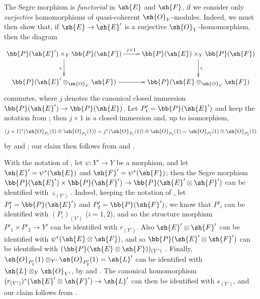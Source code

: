 \begin{env}[4.3.4]
\label{II.4.3.4}
The Segre morphism is \emph{functorial} in $\sh{E}$ and $\sh{F}$, if we consider only
\emph{surjective} homomorphisms of quasi-coherent $\sh{O}_Y$-modules.
Indeed, we must then show that, if $\sh{E}\to\sh{E}'$ is a surjective $\sh{O}_Y$-homomorphism, then the diagram
\[
  \xymatrix{
    \bb{P}(\sh{E}')\times_Y\bb{P}(\sh{F}) \ar[r]^{j\times1} \ar[d]_{\varsigma}
    & \bb{P}(\sh{E})\times_Y\bb{P}(\sh{F}) \ar[d]^{\varsigma}
  \\\bb{P}(\sh{E}'\otimes_{\sh{O}_Y}\sh{F}) \ar[r]
    &\bb{P}(\sh{E}\otimes_{\sh{O}_Y}\sh{F})
  }
\]
commutes, where $j$ denotes the canonical closed immersion $\bb{P}(\sh{E}')\to\bb{P}(\sh{E})$.
Let $P'_1=\bb{P}(\sh{E}')$ and keep the notation from ;
then $j\times1$ is a closed immersion  and, up to isomorphism,
\[
  (j\times1)^*(\sh{O}_{P_1}(1)\otimes\sh{O}_{P_2}(1))
  = j^*(\sh{O}_{P_1}(1))\otimes\sh{O}_{P_2}(1)
  = \sh{O}_{P'_1}(1)\otimes\sh{O}_{P_2}(1)
\]
by  and ;
our claim then follows from  and .
\end{env}

\begin{env}[4.3.5]
\label{II.4.3.5}
With the notation of , let $\psi:Y'\to Y$ be a morphism, and let $\sh{E}'=\psi^*(\sh{E})$ and $\sh{F}'=\psi^*(\sh{F})$;
then the Segre morphism $\bb{P}(\sh{E}')\times\bb{P}(\sh{F}')\to\bb{P}(\sh{E}'\otimes\sh{F}')$ can be identified with $\varsigma_{(Y')}$.
Indeed, keeping the notation of , let $P'_1=\bb{P}(\sh{E}')$ and $P'_2=\bb{P}(\sh{F}')$;
we know  that $P'_i$ can be identified with $(P_i)_{(Y')}$ ($i=1,2$), and so the structure morphism $P'_1\times P'_2\to Y'$ can be identified with $r_{(Y')}$.
Also $\sh{E}'\otimes\sh{F}'$ can be identified with $\psi^*(\sh{E}\otimes\sh{F})$, and so $\bb{P}(\sh{E}'\otimes\sh{F}')$ can be identified with $(\bb{P}(\sh{E}\otimes\sh{F}))_{(Y')}$ .
Finally, $\sh{O}_{P'_1}(1)\otimes_{Y'}\sh{O}_{P'_2}(1)=\sh{L}'$ can be identified with $\sh{L}\otimes_Y\sh{O}_{Y'}$, by  and .
The canonical homomorphism $(r_{(Y')})^*(\sh{E}'\otimes\sh{F}')\to\sh{L}'$ can then be identified with $s_{(Y')}$, and our claim follows from .
\end{env}

